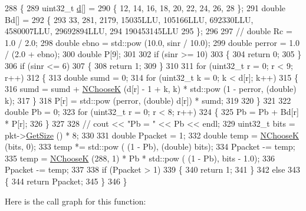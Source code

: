 \begin{DoxyCode}
288 \{
289   uint32\_t \hyperlink{buildings__pathloss_8m_a9f9b934daed17a4d3613b6886ff4cf4b}{d}[] =
290   \{ 12, 14, 16, 18, 20, 22, 24, 26, 28 \};
291   \textcolor{keywordtype}{double} Bd[] =
292   \{
293     33, 281, 2179, 15035LLU, 105166LLU, 692330LLU, 4580007LLU, 29692894LLU,
294     190453145LLU
295   \};
296 
297   \textcolor{comment}{// double Rc = 1.0 / 2.0;}
298   \textcolor{keywordtype}{double} ebno = std::pow (10.0, sinr / 10.0);
299   \textcolor{keywordtype}{double} perror = 1.0 / (2.0 + ebno);
300   \textcolor{keywordtype}{double} P[9];
301 
302   \textcolor{keywordflow}{if} (sinr >= 10)
303     \{
304       \textcolor{keywordflow}{return} 0;
305     \}
306   \textcolor{keywordflow}{if} (sinr <= 6)
307     \{
308       \textcolor{keywordflow}{return} 1;
309     \}
310 
311   \textcolor{keywordflow}{for} (uint32\_t r = 0; r < 9; r++)
312     \{
313       \textcolor{keywordtype}{double} sumd = 0;
314       \textcolor{keywordflow}{for} (uint32\_t k = 0; k < d[r]; k++)
315         \{
316           sumd = sumd + \hyperlink{classns3_1_1UanPhyPerUmodem_aa76cc90b685b1bf88a1ecbc76f9c229d}{NChooseK} (d[r] - 1 + k, k) * std::pow (1 - perror, (\textcolor{keywordtype}{double}) k);
317         \}
318       P[r] = std::pow (perror, (\textcolor{keywordtype}{double}) d[r]) * sumd;
319 
320     \}
321 
322   \textcolor{keywordtype}{double} Pb = 0;
323   \textcolor{keywordflow}{for} (uint32\_t r = 0; r < 8; r++)
324     \{
325       Pb = Pb + Bd[r] * P[r];
326     \}
327 
328   \textcolor{comment}{// cout << "Pb = " << Pb << endl;}
329   uint32\_t bits = pkt->\hyperlink{classns3_1_1Packet_a462855c9929954d4301a4edfe55f4f1c}{GetSize} () * 8;
330 
331   \textcolor{keywordtype}{double} Ppacket = 1;
332   \textcolor{keywordtype}{double} temp = \hyperlink{classns3_1_1UanPhyPerUmodem_aa76cc90b685b1bf88a1ecbc76f9c229d}{NChooseK} (bits, 0);
333   temp *= std::pow ( (1 - Pb), (\textcolor{keywordtype}{double}) bits);
334   Ppacket -= temp;
335   temp = \hyperlink{classns3_1_1UanPhyPerUmodem_aa76cc90b685b1bf88a1ecbc76f9c229d}{NChooseK} (288, 1) * Pb * std::pow ( (1 - Pb), bits - 1.0);
336   Ppacket -= temp;
337 
338   \textcolor{keywordflow}{if} (Ppacket > 1)
339     \{
340       \textcolor{keywordflow}{return} 1;
341     \}
342   \textcolor{keywordflow}{else}
343     \{
344       \textcolor{keywordflow}{return} Ppacket;
345     \}
346 \}
\end{DoxyCode}


Here is the call graph for this function\+:




